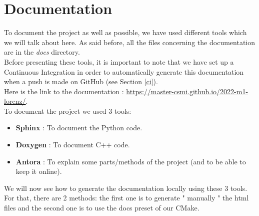 \newpage

\section{Documentation}
\label{doc}

	To document the project as well as possible, we have used different tools which we will talk about here. As said before, all the files concerning the documentation are in the \textit{docs} directory. \\
	Before presenting these tools, it is important to note that we have set up a Continuous Integration in order to automatically generate this documentation when a push is made on GitHub (see Section \ref{ci}). \\
	Here is the link to the documentation : \url{https://master-csmi.github.io/2022-m1-lorenz/}. \\
	To document the project we used 3 tools:
	\begin{itemize}[label=-]
		\item \textbf{Sphinx\cite{sphinx_doc}} : To document the Python code. 
		\item \textbf{Doxygen\cite{doxygen_doc}} : To document C++ code.
		\item \textbf{Antora\cite{antora_doc}} : To explain some parts/methods of the project (and to be able to keep it online).
	\end{itemize}
	We will now see how to generate the documentation locally using these 3 tools. For that, there are 2 methods: the first one is to generate " manually " the html files and the second one is to use the docs preset of our CMake.
